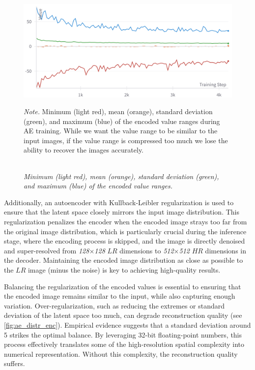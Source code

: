 \begin{figure}[H]
    \caption{\doublespacing \\ \textit{Minimum (light red), mean (orange), standard deviation (green), and maximum (blue) of the encoded value ranges.}} 
    \centering
    \includegraphics[width=1\linewidth]{images/simon/ae_distr_enc.png}
    \begin{justify}
        \textit{Note.} Minimum (light red), mean (orange), standard deviation (green), and maximum (blue) of the encoded value ranges during AE training. While we want the value range to be similar to the input images, if the value range is compressed too much we lose the ability to recover the images accurately.
    \end{justify}                    
    \label{fig:ae_distr_enc}
\end{figure}


Additionally, an autoencoder with Kullback-Leibler regularization is used to ensure that the latent space closely mirrors the input image distribution. This regularization penalizes the encoder when the encoded image strays too far from the original image distribution, which is particularly crucial during the inference stage, where the encoding process is skipped, and the image is directly denoised and super-resolved from \textit{128$\times$128} $LR$ dimensions to \textit{512$\times$512} $HR$ dimensions in the decoder. Maintaining the encoded image distribution as close as possible to the $LR$ image (minus the noise) is key to achieving high-quality results.

Balancing the regularization of the encoded values is essential to ensuring that the encoded image remains similar to the input, while also capturing enough variation. Over-regularization, such as reducing the extremes or standard deviation of the latent space too much, can degrade reconstruction quality (see \autoref{fig:ae_distr_enc}). Empirical evidence suggests that a standard deviation around 5 strikes the optimal balance. By leveraging 32-bit floating-point numbers, this process effectively translates some of the high-resolution spatial complexity into numerical representation. Without this complexity, the reconstruction quality suffers.

